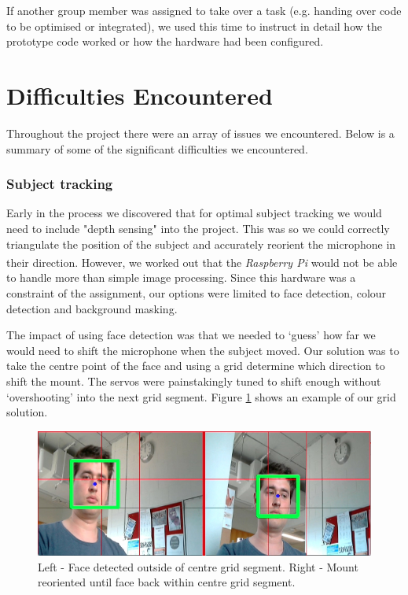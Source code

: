 \documentclass[11pt,a4paper,titlepage]{report}
\newcommand{\rpi}{\textit{Raspberry Pi\textsuperscript{\textregistered}}}
\begin{document}
If another group member was assigned to take over a task (e.g. handing over code to be optimised or integrated), we used this time to instruct in detail how the prototype code worked or how the hardware had been configured. 

\section{Difficulties Encountered}


Throughout the project there were an array of issues we encountered. Below is a summary of some of the significant difficulties we encountered.

\subsubsection{Subject tracking}

Early in the process we discovered that for optimal subject tracking we would need to include "depth sensing" into the project. This was so we could correctly triangulate the position of the subject and accurately reorient the microphone in their direction. However, we worked out that the \rpi\xspace would not be able to handle more than simple image processing. Since this hardware was a constraint of the assignment, our options were limited to face detection, colour detection and background masking. 

The impact of using face detection was that we needed to `guess' how far we would need to shift the microphone when the subject moved. Our solution was to take the centre point of the face and using a grid determine which direction to shift the mount. The servos were painstakingly tuned to shift enough without `overshooting' into the next grid segment. Figure \ref{fig:face} shows an example of our grid solution.

\begin{figure}
\centering
\includegraphics[width=\textwidth]{graphs/face.jpg}
\caption{Left - Face detected outside of centre grid segment. Right - Mount reoriented until face back within centre grid segment.}
\label{fig:face}
\end{figure}
\end{document}
